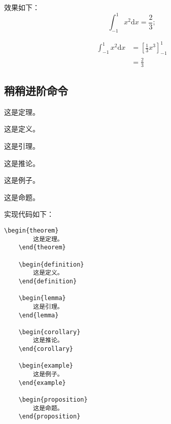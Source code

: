 效果如下：
\begin{equation*}
    \int_{-1}^{1}x^2 \textrm{d}x=\frac{2}{3};
\end{equation*}

\begin{equation}
\begin{aligned}
    \int_{-1}^{1}x^2 \textrm{d}x&=\left[\frac{1}{3}x^3\right]_{-1}^1\\
    &=\frac{2}{3}
\end{aligned}
\end{equation}

\subsection{稍稍进阶命令}

\begin{theorem}
    这是定理。
\end{theorem}

\begin{definition}
    这是定义。
\end{definition}

\begin{lemma}
    这是引理。
\end{lemma}

\begin{corollary}
    这是推论。    
\end{corollary}

\begin{example}
    这是例子。
\end{example}

\begin{proposition}
    这是命题。
\end{proposition}

实现代码如下：
\begin{center}
\begin{minipage}{0.8\textwidth}
    \hspace{1em}
\begin{lstlisting}[language={[LaTeX]TeX}]
    \begin{theorem}
        这是定理。
    \end{theorem}
    
    \begin{definition}
        这是定义。
    \end{definition}
    
    \begin{lemma}
        这是引理。
    \end{lemma}
    
    \begin{corollary}
        这是推论。    
    \end{corollary}
    
    \begin{example}
        这是例子。
    \end{example}
    
    \begin{proposition}
        这是命题。
    \end{proposition}
\end{lstlisting}
\end{minipage}
\end{center}

